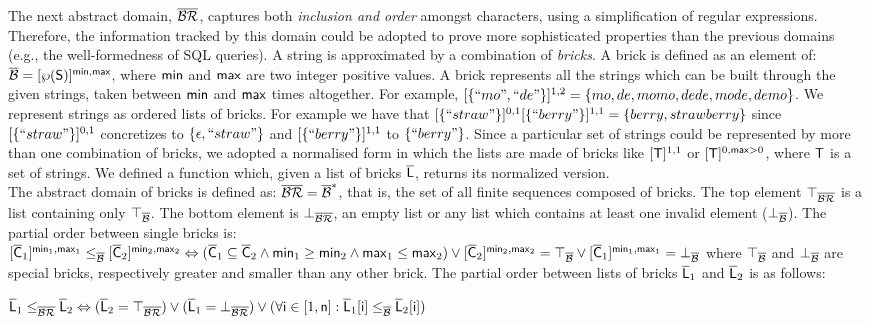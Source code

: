 \documentclass[orivec]{llncs}
\begin{document}
The next abstract domain, $\mathsf{\overline{\mathsf{\mathcal{BR}}}}$, captures both \emph{inclusion and order} amongst characters, using a simplification of regular expressions. Therefore, the information tracked by this domain could be adopted to prove more sophisticated properties than the previous domains (e.g., the well-formedness of SQL queries). A string is approximated by a combination of \textit{bricks}. A brick is defined as an element of: $\mathsf{\overline{\mathcal{B}}} = [\wp(\mathsf{S})]^{\mathsf{min},\mathsf{max}}$, where $\mathsf{min}$ and $\mathsf{max}$ are two integer positive values. A brick represents all the strings which can be built through the given strings, taken between $\mathsf{min}$ and $\mathsf{max}$ times altogether. For example, $[\{``mo", ``de"\}]^{1,2} = \{ mo, de, momo, dede, mode, \allowbreak demo\}$. We represent strings as ordered lists of bricks. For example we have that $[\{``straw"\}]^{0,1} [\{``berry"\}]^{1,1} = \{berry, strawberry\}$ since $[\{``straw"\}]^{0,1}$ concretizes to $\{\epsilon, ``straw"\}$ and $[\{``berry"\}]^{1,1}$ to $\{``berry"\}$. Since a particular set of strings could be represented by more than one combination of bricks, we adopted a normalised form in which the lists are made of bricks like $[\mathsf{T}]^{1,1}$ or $[\mathsf{T}]^{0,\mathsf{max}>0}$, where $\mathsf{T}$ is a set of strings. We defined a function  which, given a list of bricks $\mathsf{\overline{L}}$, returns its normalized version.
\\The abstract domain of bricks is defined as: $\mathsf{\overline{\mathsf{\mathcal{BR}}}} = \mathsf{\overline{\mathcal{B}}}^*$, that is, the set of all finite sequences composed of bricks. The top element $\top_{\mathsf{\overline{\mathsf{\mathcal{BR}}}}}$ is a list containing only $\top_{\mathsf{\overline{\mathcal{B}}}}$. The bottom element is $\bot_{\mathsf{\overline{\mathsf{\mathcal{BR}}}}}$, an empty list or any list which contains at least one invalid element ($\bot_{\mathsf{\overline{\mathcal{B}}}}$). The partial order between single bricks is: $[\mathsf{\overline{C}}_1]^{\mathsf{min}_1,\mathsf{max}_1} \leq_{\mathsf{\overline{\mathcal{B}}}} [\mathsf{\overline{C}}_2]^{\mathsf{min}_2, \mathsf{max}_2} \Leftrightarrow (\mathsf{\overline{C}}_1 \subseteq \mathsf{\overline{C}}_2 \land \mathsf{min}_1 \ge \mathsf{min}_2 \land \mathsf{max}_1 \le \mathsf{max}_2) \lor [\mathsf{\overline{C}}_2]^{\mathsf{min}_2, \mathsf{max}_2} = \top_{\mathsf{\overline{\mathcal{B}}}} \lor [\mathsf{\overline{C}}_1]^{\mathsf{min}_1,\mathsf{max}_1} = \bot_{\mathsf{\overline{\mathcal{B}}}}$ where 
$\top_{\mathsf{\overline{\mathcal{B}}}}$ and $\bot_{\mathsf{\overline{\mathcal{B}}}}$ are special bricks, respectively greater and smaller than any other brick. The partial order between lists of bricks $\mathsf{\overline{L}}_1$ and $\mathsf{\overline{L}}_2$ is as follows: 
 
$\mathsf{\overline{L}}_1 \le_{\mathsf{\overline{\mathsf{\mathcal{BR}}}}} \mathsf{\overline{L}}_2 \Leftrightarrow (\mathsf{\overline{L}}_2=\top_{\mathsf{\overline{\mathsf{\mathcal{BR}}}}}) \lor (\mathsf{\overline{L}}_1=\bot_{\mathsf{\overline{\mathsf{\mathcal{BR}}}}}) \lor (\forall \mathsf{i} \in [1,\mathsf{n}] : {\mathsf{\overline{L}}_1} [\mathsf{i}] \le_{\mathsf{\overline{\mathcal{B}}}} {\mathsf{\overline{L}}_2}[\mathsf{i}] )$
 
\end{document}
